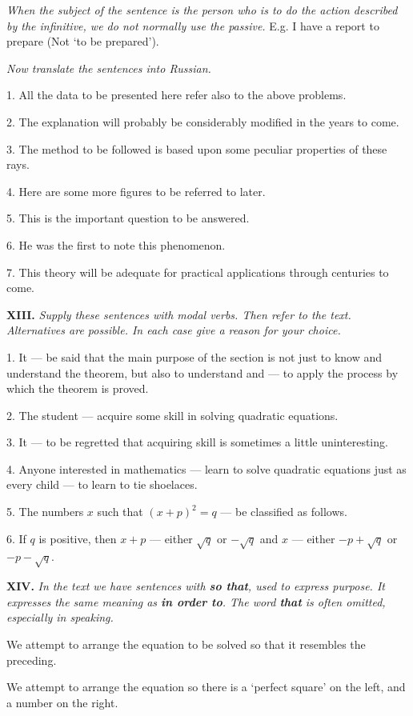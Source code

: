 \documentclass[a4paper]{article}
\newcommand{\ETask}[2]{\medskip\par\textbf{#1.} \textit{#2}\par}
\begin{document}
\textit{When the subject of the sentence is the person who is to do the action described by the infinitive, we do not normally
use the passive.}
E.g. I have a report to prepare (Not `to be prepared').

\textit{Now translate the sentences into Russian.}

1. All the data to be presented here refer also to the above problems.

2. The explanation will probably be considerably modified in the years to come.

3. The method to be followed is based upon some peculiar properties of these rays.

4. Here are some more figures to be referred to later.

5. This is the important question to be answered.

6. He was the first to note this phenomenon.

7. This theory will be adequate for practical applications through centuries to come.

\ETask{XIII}{Supply these sentences with modal verbs. Then refer
to the text. Alternatives are possible. In each case give a reason
for your choice.}

1. It --- be said that the main purpose of the section is not just to know and understand the theorem, but also to understand
and --- to apply the process by which the theorem is proved.

2. The student --- acquire some skill in solving quadratic equations.

3. It --- to be regretted that acquiring skill is sometimes a little uninteresting.

4. Anyone interested in mathematics --- learn to solve quadratic equations just as every child --- to learn to tie shoelaces.

5. The numbers $x$ such that $(x + p)^2 = q$ --- be classified as follows.

6. If $q$ is positive, then $x + p$ --- either $\sqrt{q}$ or $-\sqrt{q}$ and $x$ --- either $-p+\sqrt{q}$ or $-p-\sqrt{q}$.

\ETask{XIV}{In the text we have sentences with \textbf{so that}, used to express purpose. It expresses the same meaning as
\textbf{in order to}. The word \textbf{that} is often omitted, especially in speaking.}
We attempt to arrange the equation to be solved so that it resembles the preceding.

We attempt to arrange the equation so there is a `perfect square' on the left, and a number on the right.
\end{document}
